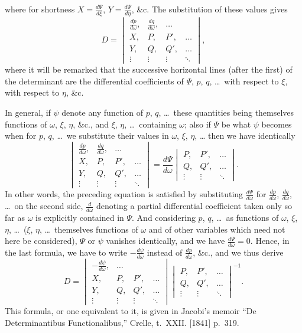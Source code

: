 \documentclass[11pt,a4paper]{book}
\begin{document}
\newpage

\setcounter{page}{440}

where for shortness $X = \frac{d\Psi}{d\xi}$, $Y = \frac{d\Psi}{d\eta}$, \&c. The substitution of these values gives
\[
D = \begin{vmatrix}
\frac{dp}{d\omega}, & \frac{dq}{d\omega}, & \ldots \\
X, & P, & P', & \ldots \\
Y, & Q, & Q', & \ldots \\
\vdots & \vdots & \vdots & \ddots
\end{vmatrix},
\]
where it will be remarked that the successive horizontal lines (after the first) of the determinant are the differential coefficients of $\Psi$, $p$, $q$, \ldots\ with respect to $\xi$, with respect to $\eta$, \&c.

In general, if $\psi$ denote any function of $p$, $q$, \ldots\ these quantities being themselves functions of $\omega$, $\xi$, $\eta$, \&c., and $\xi$, $\eta$, \ldots\ containing $\omega$; also if $\Psi$ be what $\psi$ becomes when for $p$, $q$, \ldots\ we substitute their values in $\omega$, $\xi$, $\eta$, \ldots\; then we have identically
\[
\begin{vmatrix}
\frac{dp}{d\omega}, & \frac{dq}{d\omega}, & \ldots \\
X, & P, & P', & \ldots \\
Y, & Q, & Q', & \ldots \\
\vdots & \vdots & \vdots & \ddots
\end{vmatrix}
= \frac{d\Psi}{d\omega}\begin{vmatrix}
P, & P', & \ldots \\
Q, & Q', & \ldots \\
\vdots & \vdots & \ddots
\end{vmatrix}.
\]
In other words, the preceding equation is satisfied by substituting $\frac{d\Psi}{d\omega}$ for $\frac{dp}{d\omega}$, $\frac{dq}{d\omega}$, \ldots\ on the second side, $\frac{d}{d\omega}$ denoting a partial differential coefficient taken only so far as $\omega$ is explicitly contained in $\Psi$. And considering $p$, $q$, \ldots\ as functions of $\omega$, $\xi$, $\eta$, \ldots\ ($\xi$, $\eta$, \ldots\ themselves functions of $\omega$ and of other variables which need not here be considered), $\Psi$ or $\psi$ vanishes identically, and we have $\frac{d\Psi}{d\omega} = 0$. Hence, in the last formula, we have to write $-\frac{d\psi}{d\omega}$ instead of $\frac{dp}{d\omega}$, \&c., and we thus derive
\[
D = \begin{vmatrix}
-\frac{d\psi}{d\omega}, & \ldots \\
X, & P, & P', & \ldots \\
Y, & Q, & Q', & \ldots \\
\vdots & \vdots & \vdots & \ddots
\end{vmatrix}
\begin{vmatrix}
P, & P', & \ldots \\
Q, & Q', & \ldots \\
\vdots & \vdots & \ddots
\end{vmatrix}^{-1}.
\]
This formula, or one equivalent to it, is given in Jacobi's memoir ``De Determinantibus Functionalibus,'' Crelle, t.~XXII. [1841] p.~319.
\end{document}
